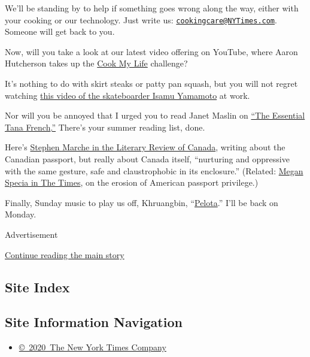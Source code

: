 We'll be standing by to help if something goes wrong along the way,
either with your cooking or our technology. Just write us:
\href{mailto:cookingcare@NYTimes.com}{\nolinkurl{cookingcare@NYTimes.com}}.
Someone will get back to you.

Now, will you take a look at our latest video offering on YouTube, where
Aaron Hutcherson takes up the
\href{https://www.youtube.com/watch?v=5ybS5epdjZk}{Cook My Life}
challenge?

It's nothing to do with skirt steaks or patty pan squash, but you will
not regret watching
\href{https://www.youtube.com/watch?v=x3ici7djACc\&t=15s}{this video of
the skateboarder Isamu Yamamoto} at work.

Nor will you be annoyed that I urged you to read Janet Maslin on
\href{https://www.nytimes3xbfgragh.onion/2020/07/29/books/the-essential-tana-french.html}{``The
Essential Tana
French}.\href{https://www.nytimes3xbfgragh.onion/2020/07/29/books/the-essential-tana-french.html}{''}
There's your summer reading list, done.

Here's
\href{https://reviewcanada.ca/magazine/2020/07/the-passport/}{Stephen
Marche in the Literary Review of Canada}, writing about the Canadian
passport, but really about Canada itself, ``nurturing and oppressive
with the same gesture, safe and claustrophobic in its enclosure.''
(Related:
\href{https://www.nytimes3xbfgragh.onion/2020/07/07/world/europe/american-passport-privilege-coronavirus.html}{Megan
Specia in The Times}, on the erosion of American passport privilege.)

Finally, Sunday music to play us off, Khruangbin,
``\href{https://youtu.be/UULIfPLMuDw}{Pelota}.'' I'll be back on Monday.

Advertisement

\protect\hyperlink{after-bottom}{Continue reading the main story}

\hypertarget{site-index}{%
\subsection{Site Index}\label{site-index}}

\hypertarget{site-information-navigation}{%
\subsection{Site Information
Navigation}\label{site-information-navigation}}

\begin{itemize}
\tightlist
\item
  \href{https://help.nytimes3xbfgragh.onion/hc/en-us/articles/115014792127-Copyright-notice}{©~2020~The
  New York Times Company}
\end{itemize}

